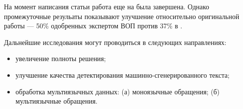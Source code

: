 \conclusion

На момент написания статьи работа еще на была завершена. Однако промежуточные резульаты показывают улучшение относительно оригинальной работы \cite{original} --- 50\% одобренных экспертом ВОП против 37\% в \cite{original}.

Дальнейшие исследования могут проводиться в следующих направлениях:
\begin{itemize}
\item увеличение полноты решения;
\item улучшение качества детектирования машинно-сгенерированного текста;
\item обработка мультиязычных данных: (а) моноязычные обращения; (б) мультиязычные обращения.
\end{itemize}